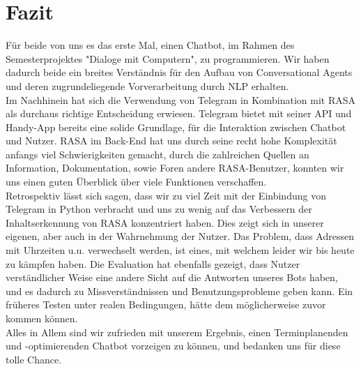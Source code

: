 \chapter{Fazit}

Für beide von uns es das erste Mal, einen Chatbot, im Rahmen des Semesterprojektes "Dialoge mit Computern", zu programmieren. Wir haben dadurch beide ein breites Verständnis für den Aufbau von Conversational Agents und deren zugrundeliegende Vorverarbeitung durch NLP erhalten.\\

Im Nachhinein hat sich die Verwendung von Telegram in Kombination mit RASA als durchaus richtige Entscheidung erwiesen. Telegram bietet mit seiner API und Handy-App bereits eine solide Grundlage, für die Interaktion zwischen Chatbot und Nutzer. RASA im Back-End hat uns durch seine recht hohe Komplexität anfangs viel Schwierigkeiten gemacht, durch die zahlreichen Quellen an Information, Dokumentation, sowie Foren andere RASA-Benutzer, konnten wir uns einen guten Überblick über viele Funktionen verschaffen.\\

Retrospektiv lässt sich sagen, dass wir zu viel Zeit mit der Einbindung von Telegram in Python verbracht und uns zu wenig auf das Verbessern der Inhaltserkennung von RASA konzentriert haben. Dies zeigt sich in unserer eigenen, aber auch in der Wahrnehmung der Nutzer. Das Problem, dass Adressen mit Uhrzeiten u.u. verwechselt werden, ist eines, mit welchem leider wir bis heute zu kämpfen haben. Die Evaluation hat ebenfalls gezeigt, dass Nutzer verständlicher Weise eine andere Sicht auf die Antworten unseres Bots haben, und es dadurch zu Missverständnissen und Benutzungsprobleme geben kann. Ein früheres Testen unter realen Bedingungen, hätte dem möglicherweise zuvor kommen können.\\

Alles in Allem sind wir zufrieden mit unserem Ergebnis, einen Terminplanenden und -optimierenden Chatbot vorzeigen zu können, und bedanken uns für diese tolle Chance. 
